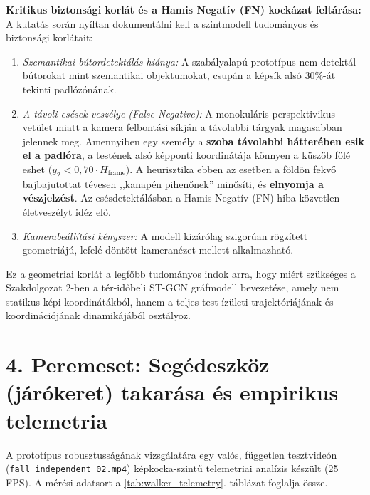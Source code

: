 \documentclass[12pt,a4paper,oneside]{report}
\begin{document}
\textbf{Kritikus biztonsági korlát és a Hamis Negatív (FN) kockázat feltárása:}
A kutatás során nyíltan dokumentálni kell a szintmodell tudományos és biztonsági korlátait:
\begin{enumerate}
    \item \textit{Szemantikai bútordetektálás hiánya:} A szabályalapú prototípus nem detektál bútorokat mint szemantikai objektumokat, csupán a képsík alsó 30\%-át tekinti padlózónának.
    \item \textit{A távoli esések veszélye (False Negative):} A monokuláris perspektivikus vetület miatt a kamera felbontási síkján a távolabbi tárgyak magasabban jelennek meg. Amennyiben egy személy a \textbf{szoba távolabbi hátterében esik el a padlóra}, a testének alsó képponti koordinátája könnyen a küszöb fölé eshet ($y_2 < 0{,}70 \cdot H_{\text{frame}}$). A heurisztika ebben az esetben a földön fekvő bajbajutottat tévesen ,,kanapén pihenőnek'' minősíti, és \textbf{elnyomja a vészjelzést}. Az esésdetektálásban a Hamis Negatív (FN) hiba közvetlen életveszélyt idéz elő.
    \item \textit{Kamerabeállítási kényszer:} A modell kizárólag szigorúan rögzített geometriájú, lefelé döntött kameranézet mellett alkalmazható.
\end{enumerate}
Ez a geometriai korlát a legfőbb tudományos indok arra, hogy miért szükséges a Szakdolgozat 2-ben a tér-időbeli ST-GCN gráfmodell bevezetése, amely nem statikus képi koordinátákból, hanem a teljes test ízületi trajektóriájának és koordinációjának dinamikájából osztályoz.

\section{4. Peremeset: Segédeszköz (járókeret) takarása és empirikus telemetria}
A prototípus robusztusságának vizsgálatára egy valós, független tesztvideón (\texttt{fall\_independent\_02.mp4}) képkocka-szintű telemetriai analízis készült (25 FPS). A mérési adatsort a \ref{tab:walker_telemetry}. táblázat foglalja össze.
\end{document}
